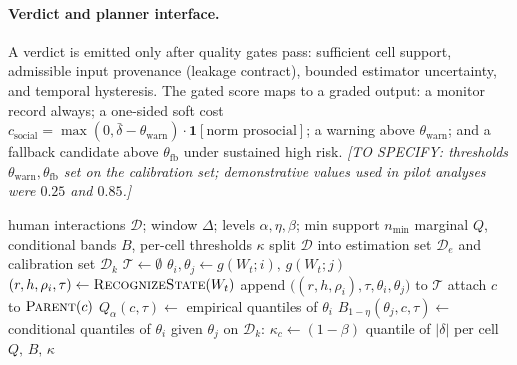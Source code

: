\documentclass[12pt,a4paper]{article}
\begin{document}
\paragraph{Verdict and planner interface.}
A verdict is emitted only after quality gates pass: sufficient cell support, admissible input
provenance (leakage contract), bounded estimator uncertainty, and temporal hysteresis. The
gated score maps to a graded output: a monitor record always; a one-sided soft cost
$c_{\mathrm{social}}=\max(0,\bar\delta-\theta_{\mathrm{warn}})\cdot\mathbf{1}[\text{norm prosocial}]$;
a warning above $\theta_{\mathrm{warn}}$; and a fallback candidate above $\theta_{\mathrm{fb}}$
under sustained high risk.
\emph{[TO SPECIFY: thresholds $\theta_{\mathrm{warn}},\theta_{\mathrm{fb}}$ set on the
calibration set; demonstrative values used in pilot analyses were $0.25$ and $0.85$.]}

\begin{algorithm}[t]
\caption{Offline calibration of dynamic and conditional envelopes}
\label{alg:calib}
\begin{algorithmic}[1]
\REQUIRE human interactions $\mathcal{D}$; window $\Delta$; levels $\alpha,\eta,\beta$;
         min support $n_{\min}$
\ENSURE marginal $Q$, conditional bands $B$, per-cell thresholds $\kappa$
\STATE split $\mathcal{D}$ into estimation set $\mathcal{D}_e$ and calibration set $\mathcal{D}_k$
\STATE $\mathcal{T}\leftarrow\emptyset$
    \STATE $\theta_i,\theta_j\leftarrow g(W_t;i),\,g(W_t;j)$ 
    \STATE $(r,h,\rho_i,\tau)\leftarrow \textsc{RecognizeState}(W_t)$
    \STATE append $\bigl((r,h,\rho_i),\tau,\theta_i,\theta_j\bigr)$ to $\mathcal{T}$
\ENDFOR
{}
        \STATE attach $c$ to $\textsc{Parent}(c)$ 
    \ENDIF
    \STATE $Q_\alpha(c,\tau)\leftarrow$ empirical quantiles of $\theta_i$
    \STATE $B_{1-\eta}(\theta_j,c,\tau)\leftarrow$ conditional quantiles of $\theta_i$ given $\theta_j$
\ENDFOR
\STATE on $\mathcal{D}_k$: $\kappa_c\leftarrow (1-\beta)$ quantile of $|\delta|$ per cell 
\RETURN $Q,\,B,\,\kappa$
\end{algorithmic}
\end{algorithm}
\end{document}
